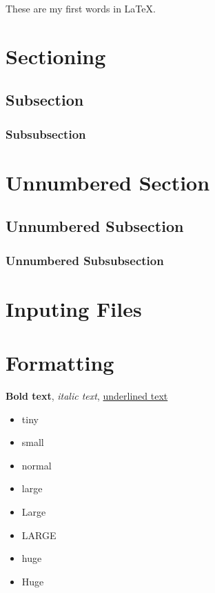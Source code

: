 \documentclass[a4paper, 12pt]{article}
\author{Author Name}
\date{\today}
\begin{document}
These are my first words in LaTeX.


\section{Sectioning}
\subsection{Subsection}
\subsubsection{Subsubsection}

\section*{Unnumbered Section}
\subsection*{Unnumbered Subsection}
\subsubsection*{Unnumbered Subsubsection}

\section{Inputing Files}


\section{Formatting}
\textbf{Bold text}, \textit{italic text}, \underline{underlined text}

\begin{itemize}
    \item \tiny tiny
    \item \small small
    \item \normalsize normal
    \item \large large
    \item \Large Large
    \item \LARGE LARGE
    \item \huge huge
    \item \Huge Huge
\end{itemize}
\end{document}

